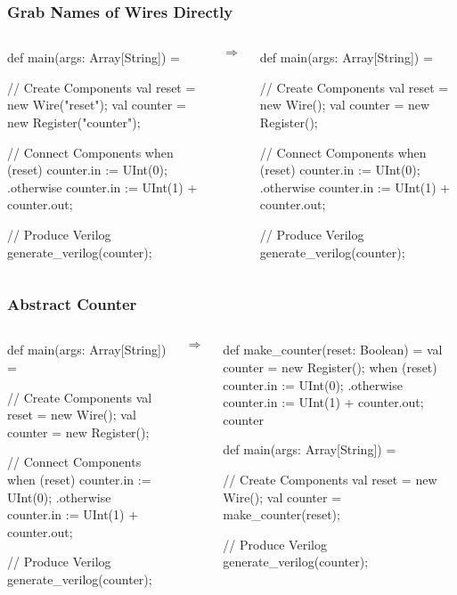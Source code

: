 \begin{frame}[fragile]
\frametitle{Grab Names of Wires Directly}
\begin{columns}
{
\begin{scala}
def main(args: Array[String]) = {
  // Create Components
  val reset   = new Wire("reset");
  val counter = new Register("counter");

  // Connect Components
  when (reset) {
    counter.in := UInt(0);
  } .otherwise {
    counter.in := UInt(1) + counter.out;
  }

  // Produce Verilog
  generate_verilog(counter);
}
\end{scala}
}
\begin{center}
$\Rightarrow$
\end{center}
{
\begin{scala}
def main(args: Array[String]) = {
  // Create Components
  val reset   = new Wire();
  val counter = new Register();

  // Connect Components
  when (reset) {
    counter.in := UInt(0);
  } .otherwise {
    counter.in := UInt(1) + counter.out;
  }

  // Produce Verilog
  generate_verilog(counter);
}
\end{scala}
}
\end{columns}
\end{frame}

\begin{frame}[fragile]
\frametitle{Abstract Counter}
\begin{columns}
{
\begin{scala}
def main(args: Array[String]) = {
  // Create Components
  val reset   = new Wire();
  val counter = new Register();

  // Connect Components
  when (reset) {
    counter.in := UInt(0);
  } .otherwise {
    counter.in := UInt(1) + counter.out;
  }

  // Produce Verilog
  generate_verilog(counter);
}
\end{scala}
}
\begin{center}
$\Rightarrow$
\end{center}
{
\begin{scala}
def make_counter(reset: Boolean) = {
  val counter = new Register();
  when (reset) {
    counter.in := UInt(0);
  } .otherwise {
    counter.in := UInt(1) + counter.out;
  }
  counter
}

def main(args: Array[String]) = {
  // Create Components
  val reset   = new Wire();
  val counter = make_counter(reset);

  // Produce Verilog
  generate_verilog(counter);
}
\end{scala}
}
\end{columns}
\end{frame}

